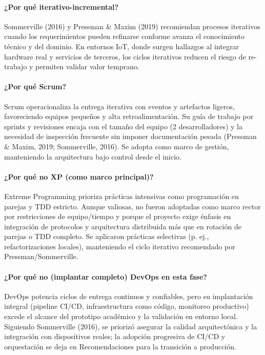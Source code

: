 \documentclass[12pt,a4paper,oneside]{report}
\begin{document}
\paragraph{¿Por qué iterativo-incremental?} Sommerville (2016) y Pressman \& Maxim (2019) recomiendan procesos iterativos cuando los requerimientos pueden refinarse conforme avanza el conocimiento técnico y del dominio. En entornos IoT, donde surgen hallazgos al integrar hardware real y servicios de terceros, los ciclos iterativos reducen el riesgo de re-trabajo y permiten validar valor temprano.

\paragraph{¿Por qué Scrum?} Scrum operacionaliza la entrega iterativa con eventos y artefactos ligeros, favoreciendo equipos pequeños y alta retroalimentación. Su guía de trabajo por sprints y revisiones encaja con el tamaño del equipo (2 desarrolladores) y la necesidad de inspección frecuente sin imponer documentación pesada (Pressman \& Maxim, 2019; Sommerville, 2016). Se adopta como marco de gestión, manteniendo la arquitectura bajo control desde el inicio.

\paragraph{¿Por qué no XP (como marco principal)?} Extreme Programming prioriza prácticas intensivas como programación en parejas y TDD estricto. Aunque valiosas, no fueron adoptadas como marco rector por restricciones de equipo/tiempo y porque el proyecto exige énfasis en integración de protocolos y arquitectura distribuida más que en rotación de parejas o TDD completo. Se aplicaron prácticas selectivas (p. ej., refactorizaciones locales), manteniendo el ciclo iterativo recomendado por Pressman/Sommerville.

\paragraph{¿Por qué no (implantar completo) DevOps en esta fase?} DevOps potencia ciclos de entrega continuos y confiables, pero su implantación integral (pipeline CI/CD, infraestructura como código, monitoreo productivo) excede el alcance del prototipo académico y la validación en entorno local. Siguiendo Sommerville (2016), se priorizó asegurar la calidad arquitectónica y la integración con dispositivos reales; la adopción progresiva de CI/CD y orquestación se deja en Recomendaciones para la transición a producción.
\end{document}

